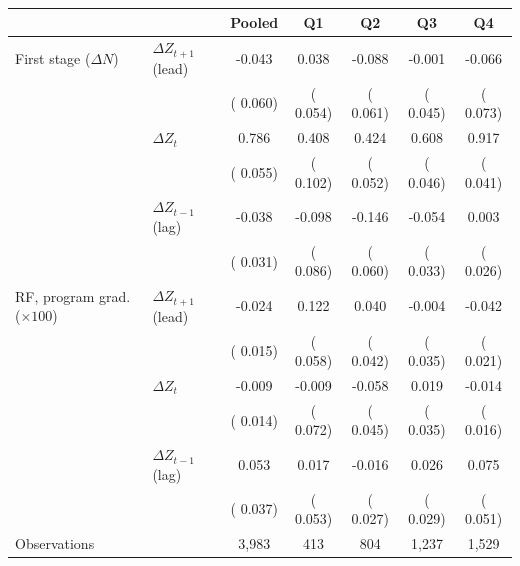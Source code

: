 \begin{tabular}{llccccc}
\toprule
 & & Pooled & Q1 & Q2 & Q3 & Q4 \\
\midrule
First stage (\(\Delta N\)) & \(\Delta Z_{t+1}\) (lead) &  -0.043 &   0.038 &  -0.088 &  -0.001 &  -0.066 \\
 &  & ( 0.060) & ( 0.054) & ( 0.061) & ( 0.045) & ( 0.073) \\
 & \(\Delta Z_t\) &   0.786\sym{***} &   0.408\sym{***} &   0.424\sym{***} &   0.608\sym{***} &   0.917\sym{***} \\
 &  & ( 0.055) & ( 0.102) & ( 0.052) & ( 0.046) & ( 0.041) \\
 & \(\Delta Z_{t-1}\) (lag) &  -0.038 &  -0.098 &  -0.146\sym{**} &  -0.054 &   0.003 \\
 &  & ( 0.031) & ( 0.086) & ( 0.060) & ( 0.033) & ( 0.026) \\
\addlinespace
RF, program grad. (\(\times 100\)) & \(\Delta Z_{t+1}\) (lead) &  -0.024 &   0.122\sym{**} &   0.040 &  -0.004 &  -0.042\sym{**} \\
 &  & ( 0.015) & ( 0.058) & ( 0.042) & ( 0.035) & ( 0.021) \\
 & \(\Delta Z_t\) &  -0.009 &  -0.009 &  -0.058 &   0.019 &  -0.014 \\
 &  & ( 0.014) & ( 0.072) & ( 0.045) & ( 0.035) & ( 0.016) \\
 & \(\Delta Z_{t-1}\) (lag) &   0.053 &   0.017 &  -0.016 &   0.026 &   0.075 \\
 &  & ( 0.037) & ( 0.053) & ( 0.027) & ( 0.029) & ( 0.051) \\
\addlinespace
Observations &  &  3,983 &    413 &    804 &  1,237 &  1,529 \\
\bottomrule
\end{tabular}
